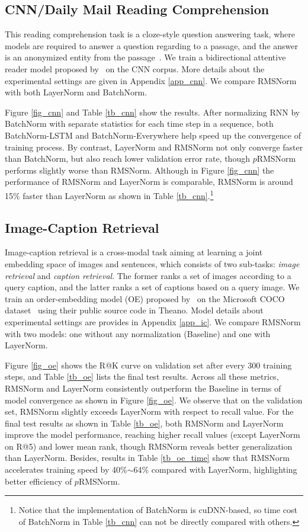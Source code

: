 \subsection{CNN/Daily Mail Reading Comprehension}

This reading comprehension task is a cloze-style question answering task, where models are required to answer a question regarding to a passage, and the answer is an anonymized entity from the passage~\cite{hermann2015teaching}. We train a bidirectional attentive reader model proposed by~\citet{hermann2015teaching} on the CNN corpus. More details about the experimental settings are given in Appendix \ref{app_cnn}. We compare RMSNorm with both LayerNorm and BatchNorm.

Figure \ref{fig_cnn} and Table \ref{tb_cnn} show the results. After normalizing RNN by BatchNorm with separate statistics for each time step in a sequence, both BatchNorm-LSTM and BatchNorm-Everywhere help speed up the convergence of training process. By contrast, LayerNorm and RMSNorm not only converge faster than BatchNorm, but also reach lower validation error rate, though $p$RMSNorm performs slightly worse than RMSNorm. Although in Figure \ref{fig_cnn} the performance of RMSNorm and LayerNorm is comparable, RMSNorm is around 15\% faster than LayerNorm as shown in Table \ref{tb_cnn}.\footnote{Notice that the implementation of BatchNorm is cuDNN-based, so time cost of BatchNorm in Table \ref{tb_cnn} can not be directly compared with others.} 

\subsection{Image-Caption Retrieval}

Image-caption retrieval is a cross-modal task aiming at learning a joint embedding space of images and sentences, which consists of two sub-tasks: \textit{image retrieval} and \textit{caption retrieval}. The former ranks a set of images according to a query caption, and the latter ranks a set of captions based on a query image. We train an order-embedding model (OE) proposed by~\citet{vendrov2015order} on the Microsoft COCO dataset~\cite{lin2014microsoft} using their public source code in Theano. Model details about experimental settings are provides in Appendix \ref{app_ic}. We compare RMSNorm with two models: one without any normalization (Baseline) and one with LayerNorm.

Figure \ref{fig_oe} shows the R@K curve on validation set after every 300 training steps, and Table \ref{tb_oe} lists the final test results. Across all these metrics, RMSNorm and LayerNorm consistently outperform the Baseline in terms of model convergence as shown in Figure \ref{fig_oe}. We observe that on the validation set, RMSNorm slightly exceeds LayerNorm with respect to recall value. For the final test results as shown in Table \ref{tb_oe}, both RMSNorm and LayerNorm improve the model performance, reaching higher recall values (except LayerNorm on R@5) and lower mean rank, though RMSNorm reveals better generalization than LayerNorm. Besides, results in Table \ref{tb_oe_time} show that RMSNorm accelerates training speed by 40\%$\sim$64\% compared with LayerNorm, highlighting better efficiency of $p$RMSNorm.

